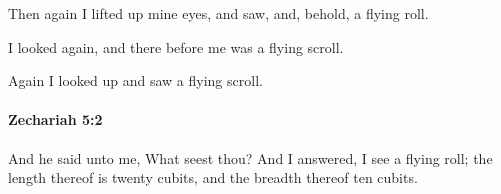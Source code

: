 			\begin{versebox}
					\item[BHS] 
					\item[LXX] 
					\item[ASV] Then again I lifted up mine eyes, and saw, and, behold, a flying roll.
					\item[NIV] I looked again, and there before me was a flying scroll.
					\item[NRSV] Again I looked up and saw a flying scroll.
			\end{versebox}

		\paragraph{Zechariah 5:2} %
			\label{ZECHARIAH-5-2}

			And he said unto me, What seest thou? And I answered, I see a flying roll; the length thereof is twenty cubits, and the breadth thereof ten cubits.

